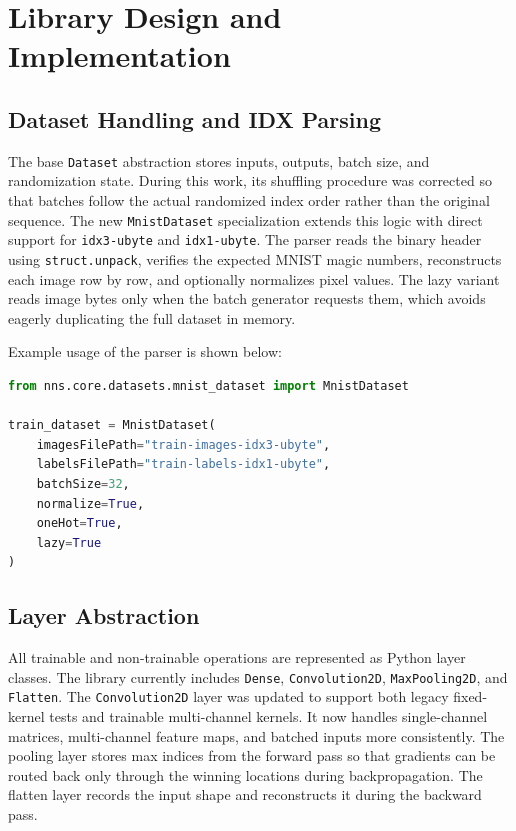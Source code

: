 \documentclass[]{ceurart}
\begin{document}
\section{Library Design and Implementation}
\subsection{Dataset Handling and IDX Parsing}
The base \texttt{Dataset} abstraction stores inputs, outputs, batch size, and randomization state. During this work, its shuffling procedure was corrected so that batches follow the actual randomized index order rather than the original sequence. The new \texttt{MnistDataset} specialization extends this logic with direct support for \texttt{idx3-ubyte} and \texttt{idx1-ubyte}. The parser reads the binary header using \texttt{struct.unpack}, verifies the expected MNIST magic numbers, reconstructs each image row by row, and optionally normalizes pixel values. The lazy variant reads image bytes only when the batch generator requests them, which avoids eagerly duplicating the full dataset in memory.

Example usage of the parser is shown below:
\begin{lstlisting}[language=Python]
from nns.core.datasets.mnist_dataset import MnistDataset

train_dataset = MnistDataset(
    imagesFilePath="train-images-idx3-ubyte",
    labelsFilePath="train-labels-idx1-ubyte",
    batchSize=32,
    normalize=True,
    oneHot=True,
    lazy=True
)
\end{lstlisting}

\subsection{Layer Abstraction}
All trainable and non-trainable operations are represented as Python layer classes. The library currently includes \texttt{Dense}, \texttt{Convolution2D}, \texttt{MaxPooling2D}, and \texttt{Flatten}. The \texttt{Convolution2D} layer was updated to support both legacy fixed-kernel tests and trainable multi-channel kernels. It now handles single-channel matrices, multi-channel feature maps, and batched inputs more consistently. The pooling layer stores max indices from the forward pass so that gradients can be routed back only through the winning locations during backpropagation. The flatten layer records the input shape and reconstructs it during the backward pass.
\end{document}
